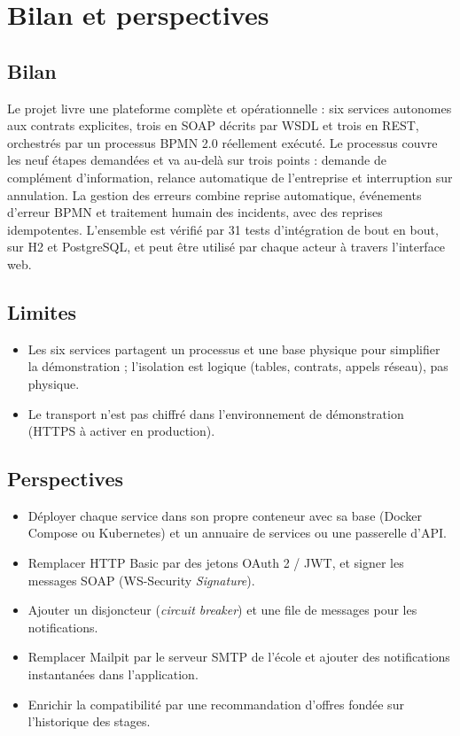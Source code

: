 \chapter{Bilan et perspectives}\label{chap:conclusion}

\section{Bilan}
Le projet livre une plateforme complète et opérationnelle : six services autonomes aux contrats explicites,
trois en SOAP décrits par WSDL et trois en REST, orchestrés par un processus BPMN 2.0 réellement exécuté.
Le processus couvre les neuf étapes demandées et va au-delà sur trois points : demande de complément d'information,
relance automatique de l'entreprise et interruption sur annulation. La gestion des erreurs combine reprise
automatique, événements d'erreur BPMN et traitement humain des incidents, avec des reprises idempotentes.
L'ensemble est vérifié par 31 tests d'intégration de bout en bout, sur H2 et PostgreSQL, et peut être utilisé par
chaque acteur à travers l'interface web.

\section{Limites}
\begin{itemize}
  \item Les six services partagent un processus et une base physique pour simplifier la démonstration ; l'isolation
        est logique (tables, contrats, appels réseau), pas physique.
  \item Le transport n'est pas chiffré dans l'environnement de démonstration (HTTPS à activer en production).
\end{itemize}

\section{Perspectives}
\begin{itemize}
  \item Déployer chaque service dans son propre conteneur avec sa base (Docker Compose ou Kubernetes) et un annuaire
        de services ou une passerelle d'API.
  \item Remplacer HTTP Basic par des jetons OAuth 2 / JWT, et signer les messages SOAP (WS-Security \emph{Signature}).
  \item Ajouter un disjoncteur (\emph{circuit breaker}) et une file de messages pour les notifications.
  \item Remplacer Mailpit par le serveur SMTP de l'école et ajouter des notifications instantanées dans l'application.
  \item Enrichir la compatibilité par une recommandation d'offres fondée sur l'historique des stages.
\end{itemize}

